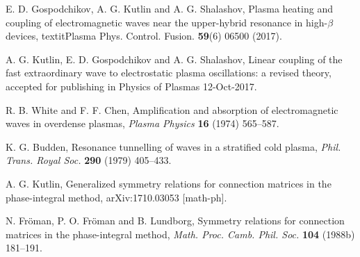 \documentclass{ws-m3as}
\begin{document}
\begin{thebibliography}{30}
 E. D. Gospodchikov, A. G. Kutlin and A. G. Shalashov, 
Plasma heating and coupling of electromagnetic waves near the upper-hybrid resonance in high-$\beta$ devices,
textit{Plasma Phys. Control. Fusion.} \textbf{59}(6) 06500 (2017).

 A. G. Kutlin, E. D. Gospodchikov and A. G. Shalashov, 
Linear coupling of the fast extraordinary wave to electrostatic plasma oscillations: a revised theory,
accepted for publishing in Physics of Plasmas 12-Oct-2017.

 R. B. White and F. F. Chen, 
Amplification and absorption of electromagnetic waves in overdense plasmas,
\textit{Plasma Physics} \textbf{16} (1974) 565--587.

 K. G. Budden, 
Resonance tunnelling of waves in a stratified cold plasma,
\textit{Phil. Trans. Royal Soc.} \textbf{290} (1979) 405--433.

  A. G. Kutlin, 	
Generalized symmetry relations for connection matrices in the phase-integral method,
arXiv:1710.03053 [math-ph].

 N. Fr\"oman, P. O. Fr\"oman and B. Lundborg, 
Symmetry relations for connection matrices in the phase-integral method,
\textit{Math. Proc. Camb. Phil. Soc.} \textbf{104} (1988b) 181--191.

\end{thebibliography}
\end{document}
